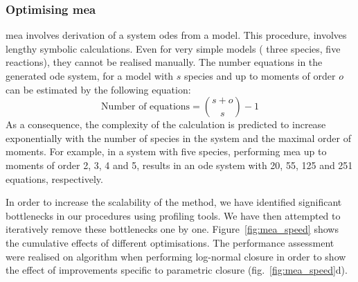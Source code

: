 \subsubsection{Optimising \acrlong{mea}}
\label{sec:optimising_mea}

\gls{mea} involves derivation of a system \gls{ode}s from a model.
This procedure\cite{ale_general_2013}, involves lengthy symbolic calculations.
Even for very simple models (\eg{} three species, five reactions), they cannot be realised manually.
The number equations in the generated \gls{ode} system, for a model with $s$ species and up to moments of order $o$ can be estimated by the following equation: 
\begin{displaymath}
    \text{Number of equations} = {{s + o} \choose {s}} - 1
\end{displaymath}
As a consequence, the complexity of the calculation is predicted to increase exponentially with the number of species in the system and the maximal order of moments. 
For example, in a system with five species,  performing \gls{mea} up to moments of order 2, 3, 4 and 5, results in an \gls{ode} system with  20, 55, 125 and 251 equations, respectively. 


In order to increase the scalability of the method, we have identified significant bottlenecks in our procedures using \py{} profiling tools.
We have then attempted to iteratively remove these bottlenecks one by one. Figure~\ref{fig:mea_speed} shows the cumulative effects of different optimisations.
The performance assessment were realised on algorithm when performing log-normal closure in order to show the effect of improvements specific to parametric closure (fig.~\ref{fig:mea_speed}d). 

